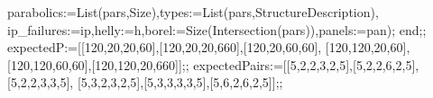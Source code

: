 \documentclass[
  10pt,
  letterpaper,
]{article}
\newenvironment{Shaded}{}{}
\newcommand{\BuiltInTok}[1]{\textcolor[rgb]{0.00,0.50,0.00}{#1}}
\newcommand{\FloatTok}[1]{\textcolor[rgb]{0.25,0.63,0.44}{#1}}
\newcommand{\FunctionTok}[1]{\textcolor[rgb]{0.02,0.16,0.49}{#1}}
\newcommand{\NormalTok}[1]{#1}
\newcommand{\OperatorTok}[1]{\textcolor[rgb]{0.40,0.40,0.40}{#1}}
\newcommand{\VariableTok}[1]{\textcolor[rgb]{0.10,0.09,0.49}{#1}}
\begin{document}
\begin{Shaded}
\begin{Highlighting}[]
  \VariableTok{parabolics}\OperatorTok{:=}\BuiltInTok{List}\NormalTok{(}\VariableTok{pars}\OperatorTok{,}\BuiltInTok{Size}\NormalTok{)}\OperatorTok{,}\VariableTok{types}\OperatorTok{:=}\BuiltInTok{List}\NormalTok{(}\VariableTok{pars}\OperatorTok{,}\BuiltInTok{StructureDescription}\NormalTok{)}\OperatorTok{,}
  \VariableTok{ip\_failures}\OperatorTok{:=}\VariableTok{ip}\OperatorTok{,}\VariableTok{helly}\OperatorTok{:=}\VariableTok{h}\OperatorTok{,}\VariableTok{borel}\OperatorTok{:=}\BuiltInTok{Size}\NormalTok{(}\BuiltInTok{Intersection}\NormalTok{(}\VariableTok{pars}\NormalTok{))}\OperatorTok{,}\VariableTok{panels}\OperatorTok{:=}\VariableTok{pan}\NormalTok{)}\OperatorTok{;}
\FunctionTok{end}\OperatorTok{;;}
\VariableTok{expectedP}\OperatorTok{:=}\NormalTok{[[}\FloatTok{120}\OperatorTok{,}\FloatTok{20}\OperatorTok{,}\FloatTok{20}\OperatorTok{,}\FloatTok{60}\NormalTok{]}\OperatorTok{,}\NormalTok{[}\FloatTok{120}\OperatorTok{,}\FloatTok{20}\OperatorTok{,}\FloatTok{20}\OperatorTok{,}\FloatTok{660}\NormalTok{]}\OperatorTok{,}\NormalTok{[}\FloatTok{120}\OperatorTok{,}\FloatTok{20}\OperatorTok{,}\FloatTok{60}\OperatorTok{,}\FloatTok{60}\NormalTok{]}\OperatorTok{,}
\NormalTok{ [}\FloatTok{120}\OperatorTok{,}\FloatTok{120}\OperatorTok{,}\FloatTok{20}\OperatorTok{,}\FloatTok{60}\NormalTok{]}\OperatorTok{,}\NormalTok{[}\FloatTok{120}\OperatorTok{,}\FloatTok{120}\OperatorTok{,}\FloatTok{60}\OperatorTok{,}\FloatTok{60}\NormalTok{]}\OperatorTok{,}\NormalTok{[}\FloatTok{120}\OperatorTok{,}\FloatTok{120}\OperatorTok{,}\FloatTok{20}\OperatorTok{,}\FloatTok{660}\NormalTok{]]}\OperatorTok{;;}
\VariableTok{expectedPairs}\OperatorTok{:=}\NormalTok{[[}\FloatTok{5}\OperatorTok{,}\FloatTok{2}\OperatorTok{,}\FloatTok{2}\OperatorTok{,}\FloatTok{3}\OperatorTok{,}\FloatTok{2}\OperatorTok{,}\FloatTok{5}\NormalTok{]}\OperatorTok{,}\NormalTok{[}\FloatTok{5}\OperatorTok{,}\FloatTok{2}\OperatorTok{,}\FloatTok{2}\OperatorTok{,}\FloatTok{6}\OperatorTok{,}\FloatTok{2}\OperatorTok{,}\FloatTok{5}\NormalTok{]}\OperatorTok{,}\NormalTok{[}\FloatTok{5}\OperatorTok{,}\FloatTok{2}\OperatorTok{,}\FloatTok{2}\OperatorTok{,}\FloatTok{3}\OperatorTok{,}\FloatTok{3}\OperatorTok{,}\FloatTok{5}\NormalTok{]}\OperatorTok{,}
\NormalTok{ [}\FloatTok{5}\OperatorTok{,}\FloatTok{3}\OperatorTok{,}\FloatTok{2}\OperatorTok{,}\FloatTok{3}\OperatorTok{,}\FloatTok{2}\OperatorTok{,}\FloatTok{5}\NormalTok{]}\OperatorTok{,}\NormalTok{[}\FloatTok{5}\OperatorTok{,}\FloatTok{3}\OperatorTok{,}\FloatTok{3}\OperatorTok{,}\FloatTok{3}\OperatorTok{,}\FloatTok{3}\OperatorTok{,}\FloatTok{5}\NormalTok{]}\OperatorTok{,}\NormalTok{[}\FloatTok{5}\OperatorTok{,}\FloatTok{6}\OperatorTok{,}\FloatTok{2}\OperatorTok{,}\FloatTok{6}\OperatorTok{,}\FloatTok{2}\OperatorTok{,}\FloatTok{5}\NormalTok{]]}\OperatorTok{;;}

\end{Highlighting}
\end{Shaded}
\end{document}
